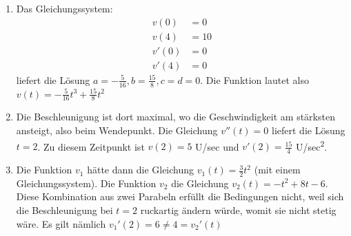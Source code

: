 \begin{enumerate}
	\item 	Das Gleichungssystem:
	      \begin{align*}
		      v(0)  & = 0  \\
		      v(4)  & = 10 \\
		      v'(0) & = 0  \\
		      v'(4) & = 0
	      \end{align*}
	      liefert die Lösung $a=-\frac{5}{16}, b=\frac{15}{8}, c=d=0$. Die Funktion lautet also $v(t)=-\frac{5}{16}t^3 +  \frac{15}{8} t^2 $
	\item Die Beschleunigung ist dort maximal, wo die Geschwindigkeit am stärksten ansteigt, also beim Wendepunkt. Die Gleichung $v''(t)=0$ liefert die Lösung $t=2$. Zu diesem Zeitpunkt ist $v(2)=5$ U/sec und $v'(2)=\frac{15}{4}$ U/sec\textsuperscript{2}.
	\item Die Funktion $v_1$ hätte dann die Gleichung $v_1 (t)=\frac{3}{2}t^2$ (mit einem Gleichungssystem). Die Funktion $v_2$ die Gleichung $v_2 (t)=-t^2+8t-6$.
	      Diese Kombination aus zwei Parabeln erfüllt die Bedingungen nicht, weil sich die Beschleunigung bei $t=2$ \glqq ruckartig\grqq{} ändern würde, womit sie nicht stetig wäre. Es gilt nämlich $v_1'(2)=6\neq 4 = v_2' (t)$

\end{enumerate}

